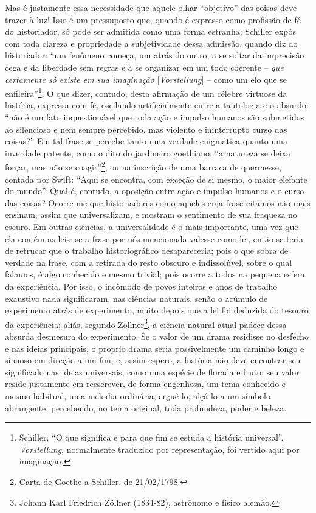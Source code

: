 Mas é justamente essa necessidade que aquele olhar ``objetivo'' das
coisas deve trazer à luz! Isso é um pressuposto que, quando é expresso
como profissão de fé do historiador, só pode ser admitida como uma forma
estranha; Schiller expôs com toda clareza e propriedade a subjetividade
dessa admissão, quando diz do historiador: ``um fenômeno começa, um
atrás do outro, a se soltar da imprecisão cega e da liberdade sem regras
e a se organizar em um todo coerente -- \emph{que certamente só existe
em sua imaginação} {[}\emph{Vorstellung}{]} -- como um elo que se
enfileira''\footnote{Schiller, ``O que significa e para que fim se
  estuda a história universal''. \emph{Vorstellung}, normalmente
  traduzido por representação, foi vertido aqui por imaginação.}. O que
dizer, contudo, desta afirmação de um célebre virtuose da história,
expressa com fé, oscilando artificialmente entre a tautologia e o
absurdo: ``não é um fato inquestionável que toda ação e impulso humanos
são submetidos ao silencioso e nem sempre percebido, mas violento e
ininterrupto curso das coisas?'' Em tal frase se percebe tanto uma
verdade enigmática quanto uma inverdade patente; como o dito do
jardineiro goethiano: ``a natureza se deixa forçar, mas não se
coagir''\footnote{Carta de Goethe a Schiller, de 21/02/1798.}, ou na
inscrição de uma barraca de quermesse, contada por Swift: ``Aqui se
encontra, com exceção de si mesmo, o maior elefante do mundo''. Qual é,
contudo, a oposição entre ação e impulso humanos e o curso das coisas?
Ocorre-me que historiadores como aqueles cuja frase citamos não mais
ensinam, assim que universalizam, e mostram o sentimento de sua fraqueza
no escuro. Em outras ciências, a universalidade é o mais importante, uma
vez que ela contém as leis: se a frase por nós mencionada valesse como
lei, então se teria de retrucar que o trabalho historiográfico
desapareceria; pois o que sobra de verdade na frase, com a retirada do
resto obscuro e indissolúvel, sobre o qual falamos, é algo conhecido e
mesmo trivial; pois ocorre a todos na pequena esfera da experiência. Por
isso, o incômodo de povos inteiros e anos de trabalho exaustivo nada
significaram, nas ciências naturais, senão o acúmulo de experimento
atrás de experimento, muito depois que a lei foi deduzida do tesouro da
experiência; aliás, segundo Zöllner\footnote{Johann Karl Friedrich
  Zöllner (1834-82), astrônomo e físico alemão.}, a ciência natural
atual padece dessa absurda desmesura do experimento. Se o valor de um
drama residisse no desfecho e nas ideias principais, o próprio drama
seria possivelmente um caminho longo e sinuoso em direção a um fim; e,
assim espero, a história não deve encontrar seu significado nas ideias
universais, como uma espécie de florada e fruto; seu valor reside
justamente em reescrever, de forma engenhosa, um tema conhecido e mesmo
habitual, uma melodia ordinária, erguê-lo, alçá-lo a um símbolo
abrangente, percebendo, no tema original, toda profundeza, poder e
beleza.

